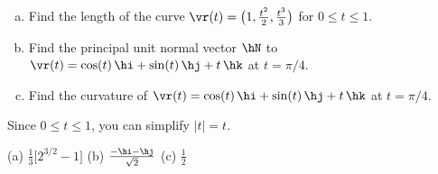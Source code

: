 
\begin{question}[M317 2015A]  %

\begin{enumerate}[(a)]
\item
Find the length of the curve  $\vr(t)=\big(1,\frac{t^2}{2},\frac{t^3}{3}\big)$
for $0\le t\le 1$.

\item
Find the principal unit normal vector $\hN$ to $\vr(t) = \cos(t)\,\hi + \sin(t)\,\hj 
+ t\,\hk$ at $t =\pi/4$.

\item
Find the curvature of $\vr(t) = \cos(t)\,\hi + \sin(t)\,\hj + t\,\hk$ 
at $t = \pi/4$.

\end{enumerate}
\end{question}

\begin{hint} 
	Since $0 \le t \le 1$, you can simplify $|t|=t$.
\end{hint}

\begin{answer} 
(a) $\frac{1}{3}\big[2^{3/2}-1\big]$\qquad
(b) $\frac{-\hi - \hj}{\sqrt{2}}$\qquad
(c) $\frac{1}{2}$
\end{answer}

